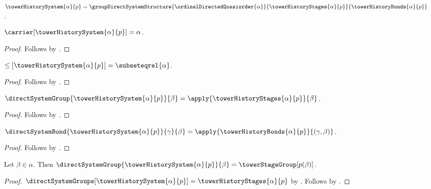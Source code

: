 \begin{abbreviation}\label{tower_history_system}
    $\towerHistorySystem{\alpha}{p}=
        \groupDirectSystemStructure
            {\ordinalDirectedQuasiorder{\alpha}}
            {\towerHistoryStages{\alpha}{p}}
            {\towerHistoryBonds{\alpha}{p}}$.
\end{abbreviation}

\begin{proposition}\label{tower_history_system_carrier}
    $\carrier[\towerHistorySystem{\alpha}{p}]=\alpha$.
\end{proposition}
\begin{proof}
    Follows by
        .
\end{proof}

\begin{proposition}\label{tower_history_system_order}
    $\leq[\towerHistorySystem{\alpha}{p}]=
        \subseteqrel{\alpha}$.
\end{proposition}
\begin{proof}
    Follows by
        .
\end{proof}

\begin{proposition}\label{tower_history_system_group_raw}
    $\directSystemGroup{\towerHistorySystem{\alpha}{p}}{\beta}
        =\apply{\towerHistoryStages{\alpha}{p}}{\beta}$.
\end{proposition}
\begin{proof}
    Follows by
        .
\end{proof}

\begin{proposition}\label{tower_history_system_bond_raw}
    $\directSystemBond{\towerHistorySystem{\alpha}{p}}{\gamma}{\beta}
        =\apply{\towerHistoryBonds{\alpha}{p}}{(\gamma,\beta)}$.
\end{proposition}
\begin{proof}
    Follows by
        .
\end{proof}

\begin{proposition}\label{tower_history_system_group}
    Let $\beta\in\alpha$.
    Then $\directSystemGroup{\towerHistorySystem{\alpha}{p}}{\beta}
        =\towerStageGroup[p(\beta)]$.
\end{proposition}
\begin{proof}
    $\directSystemGroups[\towerHistorySystem{\alpha}{p}]
        =\towerHistoryStages{\alpha}{p}$ by
        .
    Follows by
        .
\end{proof}

